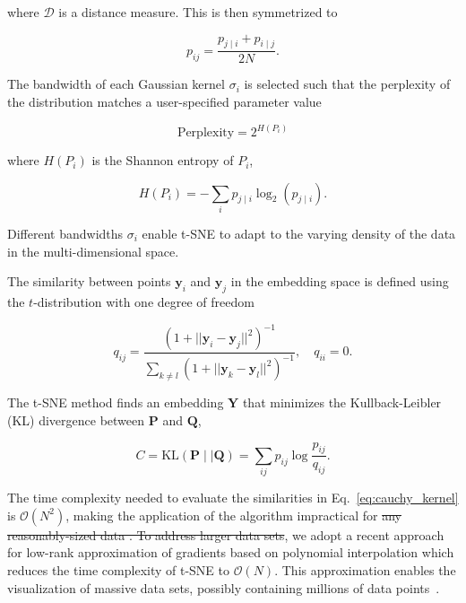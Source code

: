 \documentclass[runningheads]{llncs}
\providecommand{\DIFadd}[1]{{\protect\color{blue}\uwave{#1}}} %
\providecommand{\DIFdel}[1]{{\protect\color{red}\sout{#1}}}                      %
\providecommand{\DIFaddbegin}{} %
\providecommand{\DIFaddend}{} %
\providecommand{\DIFdelbegin}{} %
\providecommand{\DIFdelend}{} %
\newcommand{\DIFscaledelfig}{0.5}
\newlength{\DIFdelgraphicswidth} %
\newlength{\DIFdelgraphicsheight} %
\newcommand{\DIFaddincludegraphics}[2][]{{\color{blue}\fbox{\DIFOincludegraphics[#1]{#2}}}} %
\newcommand{\DIFdelincludegraphics}[2][]{%
\sbox{\DIFdelgraphicsbox}{\DIFOincludegraphics[#1]{#2}}%
\settoboxwidth{\DIFdelgraphicswidth}{\DIFdelgraphicsbox} %
\settoboxtotalheight{\DIFdelgraphicsheight}{\DIFdelgraphicsbox} %
\scalebox{\DIFscaledelfig}{%
\parbox[b]{\DIFdelgraphicswidth}{\usebox{\DIFdelgraphicsbox}\\[-\baselineskip] \rule{\DIFdelgraphicswidth}{0em}}\llap{\resizebox{\DIFdelgraphicswidth}{\DIFdelgraphicsheight}{%
\setlength{\unitlength}{\DIFdelgraphicswidth}%
\begin{picture}(1,1)%
\thicklines\linethickness{2pt} %
{\color[rgb]{1,0,0}\put(0,0){\framebox(1,1){}}}%
{\color[rgb]{1,0,0}\put(0,0){\line( 1,1){1}}}%
{\color[rgb]{1,0,0}\put(0,1){\line(1,-1){1}}}%
\end{picture}%
}\hspace*{3pt}}} %
} %
\DeclareRobustCommand{\DIFaddbegin}{\DIFOaddbegin \let\includegraphics\DIFaddincludegraphics} %
\DeclareRobustCommand{\DIFaddend}{\DIFOaddend \let\includegraphics\DIFOincludegraphics} %
\DeclareRobustCommand{\DIFdelbegin}{\DIFOdelbegin \let\includegraphics\DIFdelincludegraphics} %
\DeclareRobustCommand{\DIFdelend}{\DIFOaddend \let\includegraphics\DIFOincludegraphics} %
\begin{document}
\noindent where $\mathcal{D}$ is a distance measure. This is then symmetrized to

\begin{equation}
p_{ij} = \frac{p_{j \mid i} + p_{i \mid j}}{2N}.
\label{eq:symmetrize}
\end{equation}

The bandwidth of each Gaussian kernel $\sigma_i$ is selected such that the
perplexity of the distribution matches a user-specified parameter value

\begin{equation}
\text{Perplexity} = 2^{H(P_i)}
\end{equation}

\noindent where $H(P_i)$ is the Shannon entropy of $P_i$,

\begin{equation}
H(P_i) = -\sum_i p_{j \mid i} \log_2 (p_{j \mid i}).
\end{equation}

\noindent Different bandwidths $\sigma_i$ enable t-SNE to adapt to the varying
density of the data in the multi-dimensional space.

The similarity between points $\mathbf{y}_i$ and $\mathbf{y}_j$ in the
embedding space is defined using the $t$-distribution with one degree of
freedom

\begin{equation}
q_{ij} = \frac{\left ( 1 + || \mathbf{y}_i - \mathbf{y}_j ||^2 \right )^{-1}}{\sum_{k \neq l}\left ( 1 + || \mathbf{y}_k - \mathbf{y}_l ||^2 \right )^{-1}},
\quad q_{ii} = 0.
\label{eq:cauchy_kernel}
\end{equation}

The t-SNE method finds an embedding $\mathbf{Y}$ that minimizes
the Kullback-Leibler (KL) divergence between $\mathbf{P}$ and $\mathbf{Q}$,

\begin{equation}
C = \text{KL}(\mathbf{P} \mid \mid \mathbf{Q}) = \sum_{ij} p_{ij} \log \frac{p_{ij}}{q_{ij}}.
\label{eq:kl_divergence}
\end{equation}

The time complexity needed to evaluate the similarities in
Eq.~\ref{eq:cauchy_kernel} is $\mathcal{O}(N^2)$, making the application of
the algorithm impractical for \DIFdelbegin \DIFdel{any reasonably-sized data . To address larger data
sets}\DIFdelend \DIFaddbegin \DIFadd{large data sets. 
Hence}\DIFaddend , we adopt a recent approach for low-rank approximation of
gradients based on polynomial interpolation which reduces the time
complexity of t-SNE to $\mathcal{O}(N)$. This approximation enables the
visualization of massive data sets, possibly containing millions of data
points~\cite{fi_tsne}.
\end{document}
